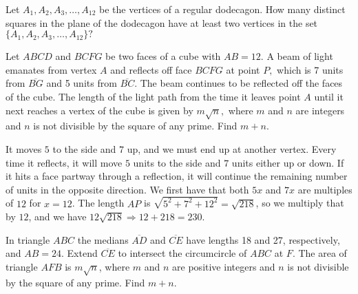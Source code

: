 %	









\begin{question}[name={2002 AIME I, \href{https://artofproblemsolving.com/community/c4p378347}{Problem 5}}]
	Let $A_1, A_2, A_3, \ldots, A_{12}$ be the vertices of a regular dodecagon. How many distinct squares in the plane of the dodecagon have at least two vertices in the set $\{A_1,A_2,A_3,\ldots,A_{12}\}?$	
	
\end{question}

%
%	
%
%





\begin{question}[name={2002 AIME I, \href{https://artofproblemsolving.com/community/c4}{Problem }}]
	Let $ABCD$ and $BCFG$ be two faces of a cube with $AB=12.$ A beam of light emanates from vertex $A$ and reflects off face $BCFG$ at point $P,$ which is 7 units from $\overline{BG}$ and 5 units from $\overline{BC}.$ The beam continues to be reflected off the faces of the cube. The length of the light path from the time it leaves point $A$ until it next reaches a vertex of the cube is given by $m\sqrt{n},$ where $m$ and $n$ are integers and $n$ is not divisible by the square of any prime. Find $m+n.$	
\end{question}


\begin{solution}[name={Solution by JesusFreak197}]
	It moves $5$ to the side and $7$ up, and we must end up at another vertex. Every time it reflects, it will move $5$ units to the side and $7$ units either up or down. If it hits a face partway through a reflection, it will continue the remaining number of units in the opposite direction. We first have that both $5x$ and $7x$ are multiples of $12$ for $x=12$. The length $AP$ is $\sqrt{5^2+7^2+12^2}=\sqrt{218}$, so we multiply that by $12$, and we have $12\sqrt{218}\Rightarrow 12+218=\boxed{230}$.	
\end{solution}




\begin{question}[name={2002 AIME I, \href{https://artofproblemsolving.com/community/c4p296336}{Problem 13}}]
	In triangle $ ABC$ the medians $ \overline{AD}$ and $ \overline{CE}$ have lengths 18 and 27, respectively, and $ AB = 24$. Extend $ \overline{CE}$ to intersect the circumcircle of $ ABC$ at $ F$. The area of triangle $ AFB$ is $ m\sqrt {n}$, where $ m$ and $ n$ are positive integers and $ n$ is not divisible by the square of any prime. Find $ m + n$.
\end{question}


